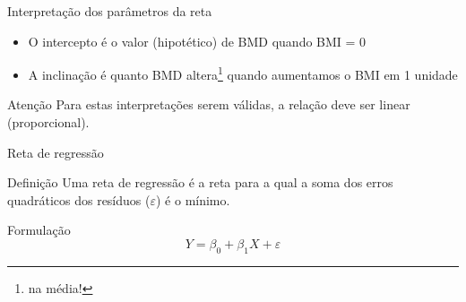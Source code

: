 \documentclass{beamer}
\begin{document}
\begin{frame}{\scriptsize Interpretação dos parâmetros da reta}
  \begin{itemize}
    \small
  \item O intercepto é o valor (hipotético) de BMD quando BMI = 0
  \item A inclinação é quanto BMD altera\footnote{na média!} quando aumentamos o BMI em 1 unidade
  \end{itemize}
  \vfill
  \begin{block}{Atenção}
    \footnotesize
    Para estas interpretações serem válidas, a relação deve ser linear (proporcional).
  \end{block}
\end{frame}

\begin{frame}{\scriptsize Reta de regressão}
  \begin{block}{Definição}
    \footnotesize
    Uma \alert{reta de regressão} é a reta para a qual a soma
    dos erros quadráticos dos resíduos ($\varepsilon$) é o mínimo.
  \end{block}
  \bigskip
  \vfill
  \begin{block}{Formulação}
    \footnotesize
    \begin{displaymath}
      Y = \beta_0 + \beta_1 X + \varepsilon
    \end{displaymath}
  \end{block}
\end{frame}
\end{document}
